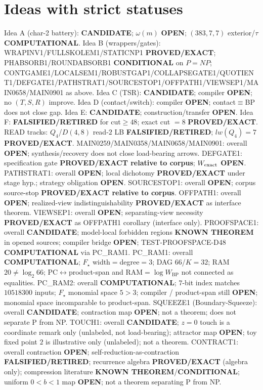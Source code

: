 \documentclass[11pt]{article}
\begin{document}
\section*{Ideas with strict statuses}
Idea A (char-2 battery): \textbf{CANDIDATE}; $\omega(m)$ \textbf{OPEN}; $(383,7,7)$ exterior/$\tau$ \textbf{COMPUTATIONAL}.
Idea B (wrappers/gates): WRAPINV1/FULLSKOLEM1/STATICNP1 \textbf{PROVED/EXACT};
PHABSORB1/ROUNDABSORB1 \textbf{CONDITIONAL} on $P=NP$;
CONTGAME1/LOCALSEM1/ROBUSTGAP1/COLLAPSEGATE1/QUOTIENT1/DEFGATE1/PATHSTRAT1/SOURCESTOP1/OFFPATH1/VIEWSEP1/MAIN0658/MAIN0901 as above.
Idea C (TSR): \textbf{CANDIDATE}; compiler \textbf{OPEN}; no $(T,S,R)$ improve.
Idea D (contact/switch): compiler \textbf{OPEN}; contact$\equiv$BP does not close gap.
Idea E: \textbf{CANDIDATE}; construction/transfer \textbf{OPEN}.
Idea F: \textbf{FALSIFIED/RETIRED} for cut$\ge48$; exact cut $=8$ \textbf{PROVED/EXACT}.
READ tracks: $Q_4$/$D(4,8)$ read-$2$ LB \textbf{FALSIFIED/RETIRED}; $lw(Q_4)=7$ \textbf{PROVED/EXACT}.
MAIN0259/MAIN0358/MAIN0658/MAIN0901: overall \textbf{OPEN}; synthesis/recovery does not close load-bearing arrows.
DEFGATE1: specification gate \textbf{PROVED/EXACT relative to corpus}; $W_{\rm exact}$ \textbf{OPEN}.
PATHSTRAT1: overall \textbf{OPEN}; local dichotomy \textbf{PROVED/EXACT} under stage hyp.; strategy obligation \textbf{OPEN}.
SOURCESTOP1: overall \textbf{OPEN}; corpus source-stop \textbf{PROVED/EXACT relative to corpus}.
OFFPATH1: overall \textbf{OPEN}; realized-view indistinguishability \textbf{PROVED/EXACT} as interface theorem.
VIEWSEP1: overall \textbf{OPEN}; separating-view necessity \textbf{PROVED/EXACT} as OFFPATH1 corollary (interface only).
PROOFSPACE1: overall \textbf{CANDIDATE}; model-local forbidden regions \textbf{KNOWN THEOREM} in opened sources;
compiler bridge \textbf{OPEN}; TEST-PROOFSPACE-D48 \textbf{COMPUTATIONAL} via PC\_RAM1.
PC\_RAM1: overall \textbf{COMPUTATIONAL}; $F_\star$ width$=$degree$=3$; DAG $66$/$K{=}32$; RAM $20\neq\log_2 66$;
PC$\leftrightarrow$product-span and RAM$=\log W_{\mathrm{BP}}$ not connected as equalities.
PC\_RAM2: overall \textbf{COMPUTATIONAL}; $7$-bit index matches $10518300$ inputs; $F_\star$ monomial space $5{>}3$;
compiler / product-span still \textbf{OPEN}; monomial space incomparable to product-span.
SQUEEZE1 (Boundary-Squeeze): overall \textbf{CANDIDATE}; contraction map \textbf{OPEN}; not a theorem;
does not separate P from NP.
TOUCH1: overall \textbf{CANDIDATE}; $z{=}0$ touch is a coordinate remark only (unlabeled, not load-bearing); attractor map \textbf{OPEN}; toy fixed point $2$ is illustrative only (unlabeled); not a theorem.
CONTRACT1: overall contraction \textbf{OPEN}; self-reduction-as-contraction \textbf{FALSIFIED/RETIRED};
recurrence algebra \textbf{PROVED/EXACT} (algebra only); compression literature \textbf{KNOWN THEOREM}/\textbf{CONDITIONAL};
uniform $0{<}b{<}1$ map \textbf{OPEN}; not a theorem separating P from NP.
\end{document}
